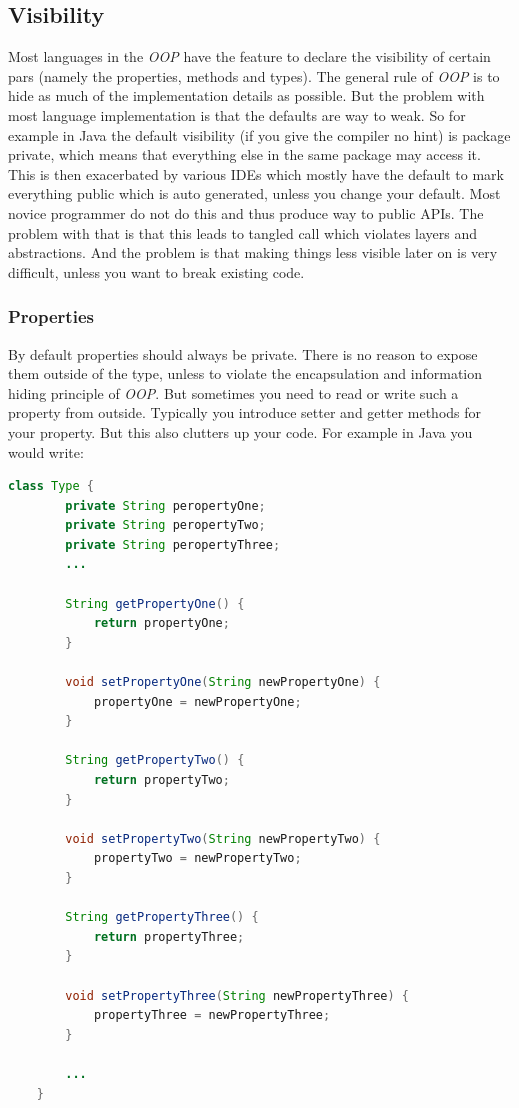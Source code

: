 \documentclass[11pt, a4paper]{report}
\begin{document}
\subsection{Visibility}

Most languages in the \textit{OOP} have the feature to declare the visibility of certain pars (namely the properties, methods and types). The general rule of \textit{OOP} is to hide as much of the implementation details as possible. But the problem with most language implementation is that the defaults are way to weak. So for example in Java the default visibility (if you give the compiler no hint) is package private, which means that everything else in the same package may access it. This is then exacerbated by various IDEs which mostly have the default to mark everything public which is auto generated, unless you change your default. Most novice programmer do not do this and thus produce way to public APIs. The problem with that is that this leads to tangled call which violates layers and abstractions. And the problem is that making things less visible later on is very difficult, unless you want to break existing code.

\subsubsection{Properties}

By default properties should always be private. There is no reason to expose them outside of the type, unless to violate the encapsulation and information hiding principle of \textit{OOP}. But sometimes you need to read or write such a property from outside. Typically you introduce setter and getter methods for your property. But this also clutters up your code. For example in Java you would write:

\begin{lstlisting}[language=Java]
    class Type {
        private String peropertyOne;
        private String peropertyTwo;
        private String peropertyThree;
        ...
        
        String getPropertyOne() {
            return propertyOne;
        }
        
        void setPropertyOne(String newPropertyOne) {
            propertyOne = newPropertyOne;
        }
        
        String getPropertyTwo() {
            return propertyTwo;
        }
        
        void setPropertyTwo(String newPropertyTwo) {
            propertyTwo = newPropertyTwo;
        }
        
        String getPropertyThree() {
            return propertyThree;
        }
        
        void setPropertyThree(String newPropertyThree) {
            propertyThree = newPropertyThree;
        }
        
        ...
    }
\end{lstlisting}
\end{document}
